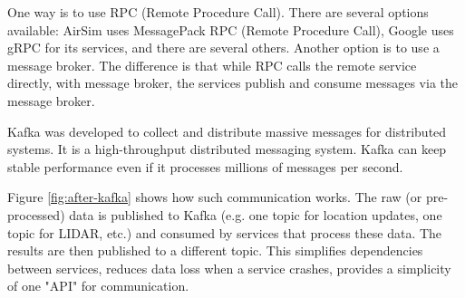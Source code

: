 \documentclass{article}
\begin{document}
One way is to use RPC (Remote Procedure Call). There are several options available: AirSim uses MessagePack RPC (Remote Procedure Call), Google uses gRPC for its services, and there are several others. Another option is to use a message broker. The difference is that while RPC calls the remote service directly, with message broker, the services publish and consume messages via the message broker.

Kafka was developed to collect and distribute massive messages for distributed systems. It is a high-throughput distributed messaging system. Kafka can keep stable performance even if it processes millions of messages per second. \cite{wang2015kafka}

Figure \ref{fig:after-kafka} shows how such communication works. The raw (or pre-processed) data is published to Kafka (e.g. one topic for location updates, one topic for LIDAR, etc.) and consumed by services that process these data. The results are then published to a different topic. This simplifies dependencies between services, reduces data loss when a service crashes, provides a simplicity of one "API" for communication.







\end{document}
